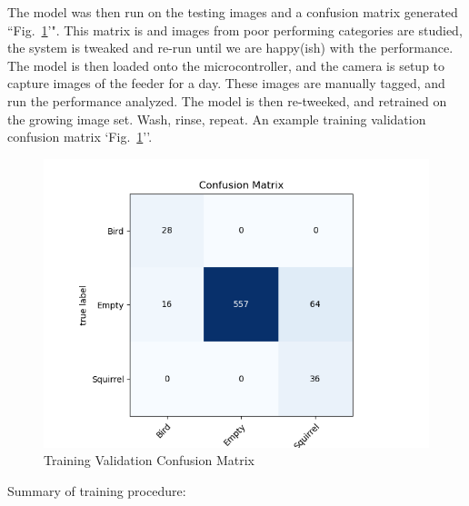 \documentclass[conference]{IEEEtran}
\begin{document}
The model was then run on the testing images and a confusion matrix generated ``Fig.~\ref{trainConfMat}'". This matrix is and images from poor performing categories are studied, the system is tweaked and re-run until we are happy(ish) with the performance.  The model is then loaded onto the microcontroller, and the camera is setup to capture images of the feeder for a day. These images are manually tagged, and run the performance analyzed. The model is then re-tweeked, and retrained on the growing image set. Wash, rinse, repeat. An example training validation confusion matrix `Fig.~\ref{trainConfMat}''.

\begin{figure}[htbp]
\centerline{\includegraphics[scale=0.4]{trainValConfMat.png}}
\caption{Training Validation Confusion Matrix}
\label{trainConfMat}
\end{figure}
\break
Summary of training procedure:
\end{document}
